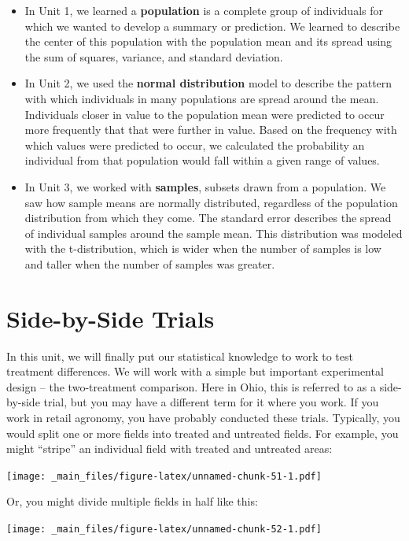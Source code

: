 \documentclass[
]{book}
\begin{document}
\begin{itemize}
\item
  In Unit 1, we learned a \textbf{population} is a complete group of
  individuals for which we wanted to develop a summary or prediction.
  We learned to describe the center of this population with the
  population mean and its spread using the sum of squares, variance,
  and standard deviation.
\item
  In Unit 2, we used the \textbf{normal distribution} model to describe the
  pattern with which individuals in many populations are spread around
  the mean. Individuals closer in value to the population mean were
  predicted to occur more frequently that that were further in value.
  Based on the frequency with which values were predicted to occur, we
  calculated the probability an individual from that population would
  fall within a given range of values.
\item
  In Unit 3, we worked with \textbf{samples}, subsets drawn from a
  population. We saw how sample means are normally distributed,
  regardless of the population distribution from which they come. The
  standard error describes the spread of individual samples around the
  sample mean. This distribution was modeled with the t-distribution,
  which is wider when the number of samples is low and taller when the
  number of samples was greater.
\end{itemize}

\hypertarget{side-by-side-trials}{%
\section{Side-by-Side Trials}\label{side-by-side-trials}}

In this unit, we will finally put our statistical knowledge to work to
test treatment differences. We will work with a simple but important
experimental design -- the two-treatment comparison. Here in Ohio, this
is referred to as a side-by-side trial, but you may have a different
term for it where you work. If you work in retail agronomy, you have
probably conducted these trials. Typically, you would split one or more
fields into treated and untreated fields. For example, you might
``stripe'' an individual field with treated and untreated areas:

\texttt{[image: \_main\_files/figure-latex/unnamed-chunk-51-1.pdf]}

Or, you might divide multiple fields in half like this:

\texttt{[image: \_main\_files/figure-latex/unnamed-chunk-52-1.pdf]}
\end{document}
